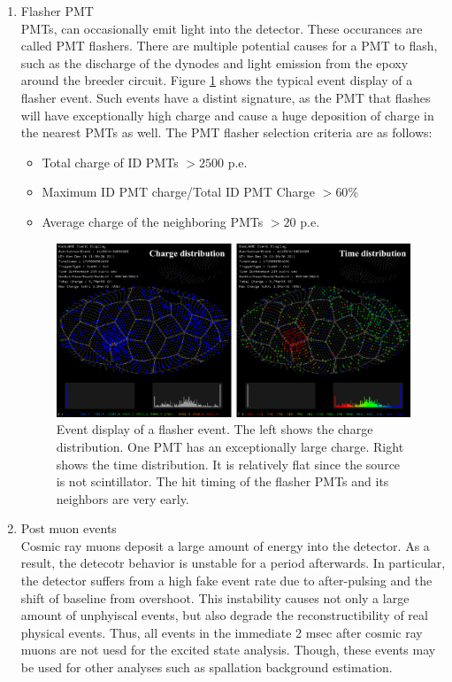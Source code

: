 \begin{enumerate}
	\item Flasher PMT \\
	PMTs, can occasionally emit light into the detector. These occurances are called PMT flashers. There are multiple potential causes for a PMT to flash, such as the discharge of the dynodes and light emission from the epoxy around the breeder circuit. Figure \ref{fig:flasher} shows the typical event display of a flasher event. Such events have a distint signature, as the PMT that flashes will have exceptionally high charge and cause a huge deposition of charge in the nearest PMTs as well. The PMT flasher selection criteria are as follows:
	\begin{itemize}
		\item Total charge of ID PMTs $ > 2500$ p.e.
		\item Maximum ID PMT charge/Total ID PMT Charge $ >60\%$
		\item Average charge of the neighboring PMTs $ > 20$ p.e.
	\end{itemize}
	\begin{figure}[htb!]
		\centering
        \includegraphics[scale=0.45]{flasher.png}
        \caption{Event display of a flasher event. The left shows the charge distribution. One PMT has an exceptionally large charge. Right shows the time distribution. It is relatively flat since the source is not scintillator. The hit timing of the flasher PMTs and its neighbors are very early.}
        \label{fig:flasher}
	\end{figure}
	\item Post muon events \\
	Cosmic ray muons deposit a large amount of energy into the detector. As a result, the detecotr behavior is unstable for a period afterwards. In particular, the detector suffers from a high fake event rate due to after-pulsing and the shift of baseline from overshoot. This instability causes not only a large amount of unphyiscal events, but also degrade the reconstructibility of real physical events. Thus, all events in the immediate 2 msec after cosmic ray muons are not uesd for the excited state analysis. Though, these events may be used for other analyses such as spallation background estimation.

\end{enumerate}
